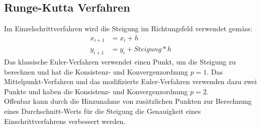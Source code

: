 \documentclass{article}
\theoremstyle{satz}
\theoremstyle{definition}
\begin{document}
\subsection{Runge-Kutta Verfahren}
Im Einzelschrittverfahren wird die Steigung im Richtungsfeld verwendet gemäss:
\begin{equation}
\begin{split}
x_{i+1} &= x_i + h\\
y_{i+1} &= y_i + \textit{Steigung} * h
\end{split}
\end{equation}
Das klassische Euler-Verfahren verwendet einen Punkt, um die Steigung zu berechnen und hat die Konsistenz- und Konvergenzordnung $p=1$. Das Mittelpunkt-Verfahren und das modifizierte Euler-Verfahren verwenden dazu zwei Punkte und haben die Konsistenz- und Konvergenzordnung $p=2$.\\
Offenbar kann durch die Hinzunahme von zusätzlichen Punkten zur Berechnung eines Durchschnitt-Werts für die Steigung die Genauigkeit eines Einschrittverfahrens verbessert werden.
\end{document}
